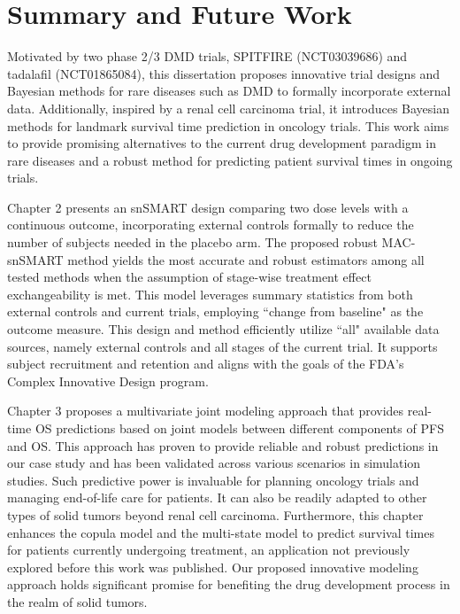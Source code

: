 \chapter{Summary and Future Work}
\label{chpt:conclusion}
Motivated by two phase 2/3 \ac{DMD} trials, SPITFIRE (NCT03039686) and tadalafil (NCT01865084), this dissertation proposes innovative trial designs and Bayesian methods for rare diseases such as \ac{DMD} to formally incorporate external data. Additionally, inspired by a renal cell carcinoma trial, it introduces Bayesian methods for landmark survival time prediction in oncology trials. This work aims to provide promising alternatives to the current drug development paradigm in rare diseases and a robust method for predicting patient survival times in ongoing trials.

Chapter 2 presents an \ac{snSMART} design comparing two dose levels with a continuous outcome, incorporating external controls formally to reduce the number of subjects needed in the placebo arm. The proposed robust MAC-snSMART method yields the most accurate and robust estimators among all tested methods when the assumption of stage-wise treatment effect exchangeability is met. This model leverages summary statistics from both external controls and current trials, employing ``change from baseline" as the outcome measure. This design and method efficiently utilize ``all" available data sources, namely external controls and all stages of the current trial. It supports subject recruitment and retention and aligns with the goals of the \ac{FDA}'s Complex Innovative Design program.

Chapter 3 proposes a multivariate joint modeling approach that provides real-time \ac{OS} predictions based on joint models between different components of \ac{PFS} and \ac{OS}. This approach has proven to provide reliable and robust predictions in our case study and has been validated across various scenarios in simulation studies. Such predictive power is invaluable for planning oncology trials and managing end-of-life care for patients. It can also be readily adapted to other types of solid tumors beyond renal cell carcinoma. Furthermore, this chapter enhances the copula model and the multi-state model to predict survival times for patients currently undergoing treatment, an application not previously explored before this work was published. Our proposed innovative modeling approach holds significant promise for benefiting the drug development process in the realm of solid tumors.

